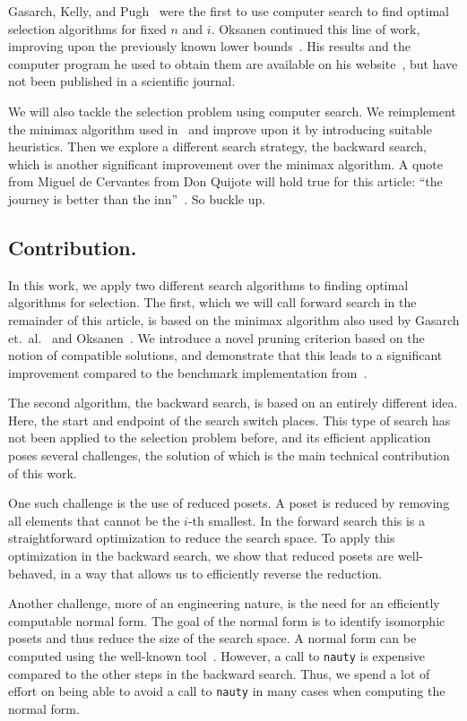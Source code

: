 \documentclass[a4paper,UKenglish,cleveref, autoref, thm-restate]{lipics-v2021}
\begin{document}
Gasarch, Kelly, and Pugh~\cite{Gasarch1996} were the first to use computer search to find optimal selection algorithms for fixed $n$ and $i$.
Oksanen continued this line of work, improving upon the previously known lower bounds~\cite{Oksanen2006}.
His results and the computer program he used to obtain them are available on his website~\cite{Oksanen}, but have not been published in a scientific journal.

We will also tackle the selection problem using computer search.
We reimplement the minimax algorithm used in~\cite{Gasarch1996,Oksanen,Oksanen2006} and improve upon it by introducing suitable heuristics.
Then we explore a different search strategy, the backward search, which is another significant improvement over the minimax algorithm.
A quote from Miguel de Cervantes from Don Quijote will hold true for this article: ``the journey is better than the inn''~\cite{cervantes_don_quijote}.
So buckle up.

\subsection{Contribution.}
In this work, we apply two different search algorithms to finding optimal algorithms for selection.
The first, which we will call forward search in the remainder of this article, is based on the minimax algorithm also used by Gasarch et.\ al\@.~\cite{Gasarch1996} and Oksanen~\cite{Oksanen,Oksanen2006}.
We introduce a novel pruning criterion based on the notion of compatible solutions, and demonstrate that this leads to a significant improvement compared to the benchmark implementation from~\cite{Oksanen}.

The second algorithm, the backward search, is based on an entirely different idea.
Here, the start and endpoint of the search switch places.
This type of search has not been applied to the selection problem before, and its efficient application poses several challenges, the solution of which is the main technical contribution of this work.

One such challenge is the use of reduced posets.
A poset is reduced by removing all elements that cannot be the $i$-th smallest.
In the forward search this is a straightforward optimization to reduce the search space.
To apply this optimization in the backward search, we show that reduced posets are well-behaved, in a way that allows us to efficiently reverse the reduction.

Another challenge, more of an engineering nature, is the need for an efficiently computable normal form.
The goal of the normal form is to identify isomorphic posets and thus reduce the size of the search space.
A normal form can be computed using the well-known  tool~\cite{MCKAY201494}.
However, a call to \texttt{nauty} is expensive compared to the other steps in the backward search.
Thus, we spend a lot of effort on being able to avoid a call to \texttt{nauty} in many cases when computing the normal form.
\end{document}
